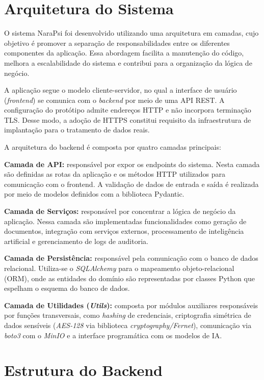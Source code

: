 \section{Arquitetura do Sistema}

O sistema NaraPsi foi desenvolvido utilizando uma arquitetura em camadas, cujo objetivo é promover a separação de responsabilidades entre os diferentes componentes da aplicação. Essa abordagem facilita a manutenção do código, melhora a escalabilidade do sistema e contribui para a organização da lógica de negócio.

A aplicação segue o modelo cliente-servidor, no qual a interface de usuário (\textit{frontend}) se comunica com o \textit{backend} por meio de uma API REST. A configuração do protótipo admite endereços HTTP e não incorpora terminação TLS. Desse modo, a adoção de HTTPS constitui requisito da infraestrutura de implantação para o tratamento de dados reais.

A arquitetura do backend é composta por quatro camadas principais:

\textbf{Camada de API:} responsável por expor os endpoints do sistema. Nesta camada são definidas as rotas da aplicação e os métodos HTTP utilizados para comunicação com o frontend. A validação de dados de entrada e saída é realizada por meio de modelos definidos com a biblioteca Pydantic.

\textbf{Camada de Serviços:} responsável por concentrar a lógica de negócio da aplicação. Nessa camada são implementadas funcionalidades como geração de documentos, integração com serviços externos, processamento de inteligência artificial e gerenciamento de logs de auditoria.

\textbf{Camada de Persistência:} responsável pela comunicação com o banco de dados relacional. Utiliza-se o \textit{SQLAlchemy} para o mapeamento objeto-relacional (ORM), onde as entidades do domínio são representadas por classes Python que espelham o esquema do banco de dados.

\textbf{Camada de Utilidades (\textit{Utils}):} composta por módulos auxiliares responsáveis por funções transversais, como \textit{hashing} de credenciais, criptografia simétrica de dados sensíveis (\textit{AES-128} via biblioteca \textit{cryptography/Fernet}), comunicação via \textit{boto3} com o \textit{MinIO} e a interface programática com os modelos de IA.

\section{Estrutura do Backend}

